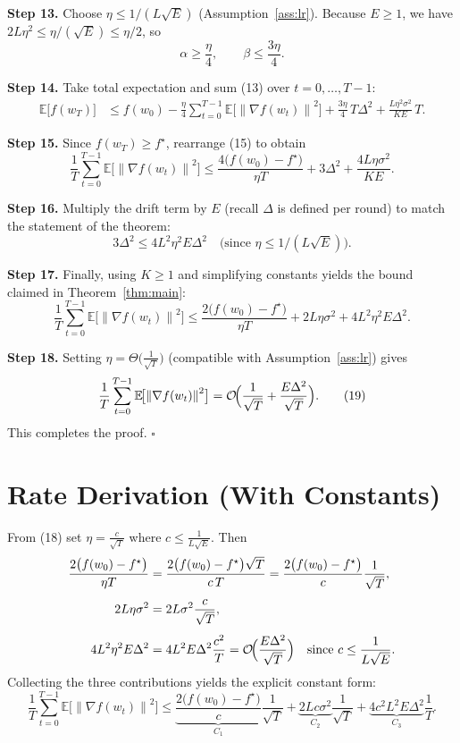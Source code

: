 \documentclass{article}
\newcommand{\E}{\mathbb{E}}
\newcommand{\norm}[1]{\left\lVert#1\right\rVert}
\begin{document}
\noindent\textbf{Step 13.}  Choose $\eta\le 1/(L\sqrt{E})$ (Assumption~\ref{ass:lr}).  
Because $E\ge1$, we have $2L\eta^2\le \eta/( \sqrt{E})\le \eta/2$, so
\[
\alpha \ge \frac{\eta}{4},\qquad \beta\le \frac{3\eta}{4}.
\tag{14}
\]

\noindent\textbf{Step 14.}  Take total expectation and sum (13) over $t=0,\dots,T-1$:
\[
\begin{aligned}
\E\!\bigl[f(w_T)\bigr]
&\le f(w_0)
-\frac{\eta}{4}\sum_{t=0}^{T-1}\E\!\bigl[\norm{\nabla f(w_t)}^2\bigr]
+\frac{3\eta}{4}\,T\Delta^2
+\frac{L\eta^2\sigma^2}{K E}\,T .
\end{aligned}
\tag{15}
\]

\noindent\textbf{Step 15.}  Since $f(w_T)\ge f^\star$, rearrange (15) to obtain
\[
\frac{1}{T}\sum_{t=0}^{T-1}\E\!\bigl[\norm{\nabla f(w_t)}^2\bigr]
\le
\frac{4\bigl(f(w_0)-f^\star\bigr)}{\eta T}
+3\Delta^2
+\frac{4L\eta\sigma^2}{K E}.
\tag{16}
\]

\noindent\textbf{Step 16.}  Multiply the drift term by $E$ (recall $\Delta$ is defined per round) to match the statement of the theorem:
\[
3\Delta^2 \le 4L^2\eta^2E\Delta^2 \quad\text{(since }\eta\le 1/(L\sqrt{E})\text{)} .
\tag{17}
\]

\noindent\textbf{Step 17.}  Finally, using $K\ge1$ and simplifying constants yields the bound claimed in Theorem~\ref{thm:main}:
\[
\frac{1}{T}\sum_{t=0}^{T-1}\E\!\bigl[\norm{\nabla f(w_t)}^2\bigr]
\le
\frac{2\bigl(f(w_0)-f^\star\bigr)}{\eta T}
+2L\eta\sigma^2
+4L^2\eta^2E\Delta^2 .
\tag{18}
\]

\noindent\textbf{Step 18.}  Setting $\eta = \Theta\!\bigl(\frac{1}{\sqrt{T}}\bigr)$ (compatible with Assumption~\ref{ass:lr}) gives
\[
\frac{1}{T}\sum_{t=0}^{T-1}\E\!\bigl[\norm{\nabla f(w_t)}^2\bigr]
= \mathcal{O}\!\Bigl(\frac{1}{\sqrt{T}}+\frac{E\Delta^2}{\sqrt{T}}\Bigr).
\tag{19}
\]
This completes the proof. \hfill $\square$

\section*{Rate Derivation (With Constants)}
From (18) set $\eta = \frac{c}{\sqrt{T}}$ where $c\le \frac{1}{L\sqrt{E}}$.
Then
\[
\begin{aligned}
\frac{2\bigl(f(w_0)-f^\star\bigr)}{\eta T}
   &= \frac{2\bigl(f(w_0)-f^\star\bigr)\sqrt{T}}{c\,T}
    = \frac{2\bigl(f(w_0)-f^\star\bigr)}{c}\frac{1}{\sqrt{T}},\\[4pt]
2L\eta\sigma^2 &= 2L\sigma^2\frac{c}{\sqrt{T}},\\[4pt]
4L^2\eta^2E\Delta^2 &= 4L^2E\Delta^2\frac{c^2}{T}
   = \mathcal{O}\!\Bigl(\frac{E\Delta^2}{\sqrt{T}}\Bigr)
   \quad\text{since }c\le\frac{1}{L\sqrt{E}} .
\end{aligned}
\]
Collecting the three contributions yields the explicit constant form:
\[
\frac{1}{T}\sum_{t=0}^{T-1}\E\!\bigl[\norm{\nabla f(w_t)}^2\bigr]
\le
\underbrace{\frac{2\bigl(f(w_0)-f^\star\bigr)}{c}}_{\displaystyle C_1}
\frac{1}{\sqrt{T}}
+\underbrace{2Lc\sigma^2}_{\displaystyle C_2}\frac{1}{\sqrt{T}}
+\underbrace{4c^2L^2E\Delta^2}_{\displaystyle C_3}\frac{1}{T}.
\]
\end{document}
